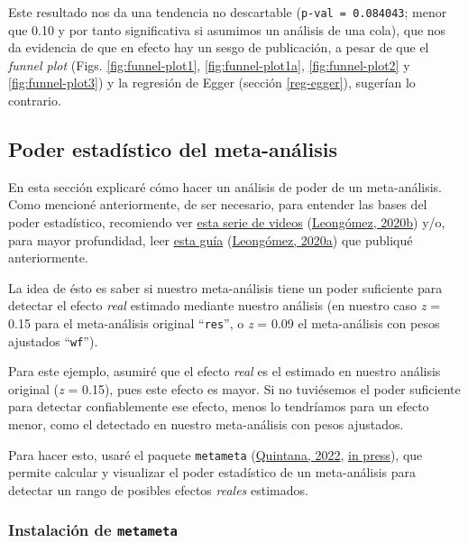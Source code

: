 \documentclass[
  bookmarksnumbered]{article}
\begin{document}
Este resultado nos da una tendencia no descartable (\texttt{p-val\ =\ 0.084043}; menor que 0.10 y por tanto significativa si asumimos un análisis de una cola), que nos da evidencia de que en efecto hay un sesgo de publicación, a pesar de que el \emph{funnel plot} (Figs. \ref{fig:funnel-plot1}, \ref{fig:funnel-plot1a}, \ref{fig:funnel-plot2} y \ref{fig:funnel-plot3}) y la regresión de Egger (sección \ref{reg-egger}), sugerían lo contrario.

\hypertarget{poder-inf}{%
\subsection{Poder estadístico del meta-análisis}\label{poder-inf}}

En esta sección explicaré cómo hacer un análisis de poder de un meta-análisis.
Como mencioné anteriormente, de ser necesario, para entender las bases del poder estadístico, recomiendo ver \href{https://youtube.com/playlist?list\%20=\%20PLHk7UNt35ccVdyHqnQ6oXVYA6JBNFrE1x}{esta serie de videos} (\protect\hyperlink{ref-leongomezPoderRvid2020}{Leongómez, 2020b}) y/o, para mayor profundidad, leer \href{https://doi.org/10.5281/zenodo.3988776}{esta guía} (\protect\hyperlink{ref-leongomezAnalisisPoderEstadistico2020}{Leongómez, 2020a}) que publiqué anteriormente.

La idea de ésto es saber si nuestro meta-análisis tiene un poder suficiente para detectar el efecto \emph{real} estimado mediante nuestro análisis (en nuestro caso \emph{z} = 0.15 para el meta-análisis original ``\texttt{res}'', o \emph{z} = 0.09 el meta-análisis con pesos ajustados ``\texttt{wf}'').

Para este ejemplo, asumiré que el efecto \emph{real} es el estimado en nuestro análisis original (\emph{z} = 0.15), pues este efecto es mayor. Si no tuviésemos el poder suficiente para detectar confiablemente ese efecto, menos lo tendríamos para un efecto menor, como el detectado en nuestro meta-análisis con pesos ajustados.

Para hacer esto, usaré el paquete \texttt{metameta} (\protect\hyperlink{ref-quintanaMetameta2022}{Quintana, 2022}, \protect\hyperlink{ref-quintanaGuideMetaPower}{in press}), que permite calcular y visualizar el poder estadístico de un meta-análisis para detectar un rango de posibles efectos \emph{reales} estimados.

\hypertarget{instalaciuxf3n-de-metameta}{%
\subsubsection{\texorpdfstring{Instalación de \texttt{metameta}}{Instalación de metameta}}\label{instalaciuxf3n-de-metameta}}
\end{document}
